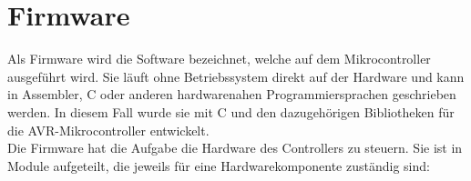 


\chapter{Firmware}
Als Firmware wird die Software bezeichnet, welche auf dem Mikrocontroller ausgeführt wird. Sie läuft ohne Betriebssystem direkt auf der Hardware und kann in Assembler, C oder anderen hardwarenahen Programmiersprachen geschrieben werden. In diesem Fall wurde sie mit C und den dazugehörigen Bibliotheken für die AVR-Mikrocontroller entwickelt.\\
Die Firmware hat die Aufgabe die Hardware des Controllers zu steuern. Sie ist in Module aufgeteilt, die jeweils für eine Hardwarekomponente zuständig sind:
